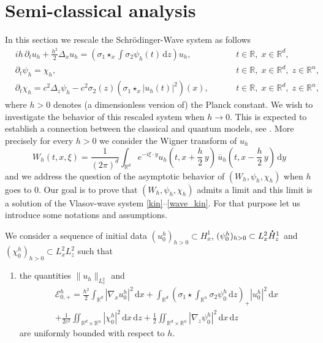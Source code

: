 \documentclass[JEP,XML,SOM,NoEqCountersInSection,NoFloatCountersInSection,Unicode,published]{cedram}
\let\bar\oldbar
\theoremstyle{definition}
\newcommand*{\overbigdot}[1]{%
\accentset{\mbox{\large\bfseries .}}{#1}}
\let\bar\overline
\newcommand{\R}{\mathbb{R}}
\let\ds\displaystyle
\newcommand{\ud}{\, {\mathrm{d}}}
\begin{document}
\section{Semi-classical analysis}\label{SClassicalAnalysis}

In this section we rescale the Schrödinger-Wave system as follows
\begin{subequations}
\begin{alignat}{11}
\label{schroh}&\ds ih\,\partial_{t}u_{h}+\frac{h^{2}}{2}\Delta_{x}u_{h}=\left(\sigma_{1}\star_{x}\int\sigma_{2}\psi_{h}(t)\ud z\right)u_{h},&\hspace{1cm}t\in\R,\;x\in\R^{d},\\
\label{wave1_schroh}&\ds \partial_{t}\psi_{h}=\chi_{h},&\hspace{1cm}t\in\R,\;x\in\R^{d},\;z\in\R^{n},\\
\label{wave2_schroh}&\ds \partial_{t}\chi_{h}=c^{2}\Delta_{z}\psi_{h}-c^{2}\sigma_{2}(z)\left(\sigma_{1}\star_{x}|u_{h}(t)|^{2}\right)(x),&\hspace{1cm}t\in\R,\;x\in\R^{d},\;z\in\R^{n},
\end{alignat}
\end{subequations}
where $h>0$ denotes (a dimensionless version of) the Planck constant.
We wish to investigate the behavior of this rescaled system when $h\to 0$. This is expected to establish a connection between the classical and quantum models, see \cite{Lions_Paul_Wigner}. More precisely for every $h>0$ we consider the Wigner transform of $u_{h}$
\[
W_{h}(t,x,\xi)=\frac{1}{(2\pi)^{d}}\int_{\R^{d}}e^{-i\xi\cdot y}u_{h}(t,x+\frac{h}{2}\,y)\,\bar{u}_{h}(t,x-\frac{h}{2}\,y)\ud y
\]
and we address the question of the asymptotic behavior of $(W_{h},\psi_{h},\chi_{h})$ when $h$ goes to $0$. Our goal is to prove that $(W_{h},\psi_{h},\chi_{h})$ admits a limit and this limit is a solution of the Vlasov-wave system \eqref{kin}--\eqref{wave_kin}. For that purpose let us introduce some notations and assumptions.

We consider a sequence of initial data $(u_{0}^{h})_{h>0}\subset H_{x}^{1}$, $(\psi_{0}^{h})_{h>0}\subset L_{x}^{2}\overbigdot{H}_{z}^{1}$ and $(\chi_{0}^{h})_{h>0}\subset L_{x}^{2}L_{z}^{2}$ such that

\begin{enumerate}\renewcommand{\theenumi}{H\arabic{enumi}}\setcounter{enumi}{4}
\item\label{h5}
the quantities $\|u_{h}\|_{L_{x}^{2}}$ and
\begin{multline*}
\mathscr{E}_{0,+}^{h}=\frac{h^{2}}{2}\int_{\R^{d}}|\nabla_{x}u_{0}^{h}|^{2}\ud x+\int_{\R^{d}}\left(\sigma_{1}\star\int_{\R^{n}}\sigma_{2}\psi_{0}^{h}\ud z\right)_{+}|u_{0}^{h}|^{2}\ud x\\
+\frac{1}{2c^{2}}\iint_{\R^{d}\times\R^{n}}|\chi_{0}^{h}|^{2}\ud x\ud z+\frac{1}{2}\iint_{\R^{d}\times\R^{n}}|\nabla_{z}\psi_{0}^{h}|^{2}\ud x\ud z
\end{multline*}
are uniformly bounded with respect to $h$.
\end{enumerate}
\end{document}
